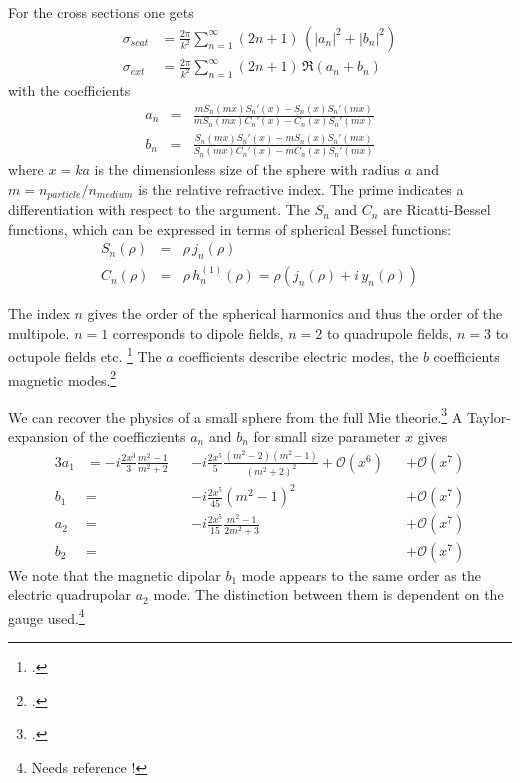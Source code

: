 For the cross sections one gets
\begin{eqnarray*}
\sigma_{scat} & = \frac{2 \pi }{k^2} \sum\limits_{n=1}^{\infty} (2 n+1) \, \left( |a_n|^2 + |b_n|^2 \right) \\
\sigma_{ext} & = \frac{2 \pi }{k^2} \sum\limits_{n=1}^{\infty} ( 2n+1)\, \Re \left( a_n + b_n \right) 
\end{eqnarray*}
%
with the coefficients
%
\begin{eqnarray*}
 a_n &= & \frac{m S_n (m x) S_n' (x) - S_n (x) S_n' (m x)}
 {m S_n (m x) C_n' (x) -  C_n (x) S_n' (m x)}  \\
 b_n &=  &\frac{S_n (m x) S_n' (x) - m S_n (x) S_n' (mx)}
  {S_n (mx) C_n' (x) - m C_n (x) S_n' (m x)} 
\end{eqnarray*}
where $x =k a $ is the dimensionless size of the sphere with radius $a$ and $m = n_{particle} / n_{medium}$ is the relative refractive index. The prime indicates a differentiation with respect to the argument. The $S_n$ and $C_n$ are Ricatti-Bessel functions, which can be expressed in terms of spherical Bessel functions:
\begin{eqnarray*}
S_n ( \rho) & =& \rho \, j_n (\rho) \\
C_n (\rho)  &= & \rho \, h_n^{(1)} (\rho)  = \rho \left(  j_n (\rho)  + i \,  y_n (\rho) \right)
\end{eqnarray*}

The index $n$ gives the order of the spherical harmonics and thus the order of the multipole. $n=1$ corresponds to dipole fields, $n=2$ to quadrupole fields, $n=3$ to octupole fields etc. \footcite{KV-book} The $a$ coefficients describe electric modes, the $b$ coefficients magnetic modes.\footcite{KV-book, BH-book} 


We can recover the physics of a small sphere from the full Mie theorie.\footcite[chapter 5]{BH-book} A Taylor-expansion of the coefficzients $a_n$ and $b_n$ for small size parameter $x$ gives
\begin{alignat*}{3}
 a_1 &= -i \frac{2x^3}{3} \frac{m^2 -1}{m^2 + 2} && -i \frac{2x^5}{5} \frac{(m^2 -2)(m^2-1)}{(m^2 + 2)^2} + \mathcal{O}(x^6)  && + \mathcal{O}(x^7) \\
 b_1 &=  && -i \frac{2x^5}{45} (m^2 -1)^2  &&+ \mathcal{O}(x^7)  \\
 a_2 &=   &&-i \frac{2x^5}{15} \frac{m^2-1}{2 m^2 +3} &&+ \mathcal{O}(x^7)  \\
b_2 &= && &&+ \mathcal{O}(x^7)  
\end{alignat*}
We note that the magnetic dipolar $b_1$ mode appears to the same order as the electric quadrupolar $a_2$ mode. The distinction between them is dependent on the gauge used.\footnote{Needs reference !}

